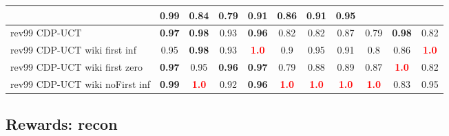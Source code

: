 \documentclass{article}
\begin{document}
\begin{tabular}{|l|r@{$\pm$}rr@{$\pm$}rr@{$\pm$}rr@{$\pm$}rr@{$\pm$}rr@{$\pm$}rr@{$\pm$}rr@{$\pm$}rr@{$\pm$}rr@{$\pm$}r|}
& \multicolumn{2}{c}{0.99}
& \multicolumn{2}{c}{0.84}
& \multicolumn{2}{c}{0.79}
& \multicolumn{2}{c}{0.91}
& \multicolumn{2}{c}{0.86}
& \multicolumn{2}{c}{0.91}
& \multicolumn{2}{c|}{0.95}
\\
\hline
rev99 CDP-UCT
& \multicolumn{2}{c}{\textbf{0.97}}
& \multicolumn{2}{c}{\textbf{0.98}}
& \multicolumn{2}{c}{0.93}
& \multicolumn{2}{c}{\textbf{0.96}}
& \multicolumn{2}{c}{0.82}
& \multicolumn{2}{c}{0.82}
& \multicolumn{2}{c}{0.87}
& \multicolumn{2}{c}{0.79}
& \multicolumn{2}{c}{\textbf{0.98}}
& \multicolumn{2}{c|}{0.82}
\\
rev99 CDP-UCT wiki first inf
& \multicolumn{2}{c}{0.95}
& \multicolumn{2}{c}{\textbf{0.98}}
& \multicolumn{2}{c}{0.93}
& \multicolumn{2}{c}{\textbf{\textcolor{red}{1.0}}}
& \multicolumn{2}{c}{0.9}
& \multicolumn{2}{c}{0.95}
& \multicolumn{2}{c}{0.91}
& \multicolumn{2}{c}{0.8}
& \multicolumn{2}{c}{0.86}
& \multicolumn{2}{c|}{\textbf{\textcolor{red}{1.0}}}
\\
rev99 CDP-UCT wiki first zero
& \multicolumn{2}{c}{\textbf{0.97}}
& \multicolumn{2}{c}{0.95}
& \multicolumn{2}{c}{\textbf{0.96}}
& \multicolumn{2}{c}{\textbf{0.97}}
& \multicolumn{2}{c}{0.79}
& \multicolumn{2}{c}{0.88}
& \multicolumn{2}{c}{0.89}
& \multicolumn{2}{c}{0.87}
& \multicolumn{2}{c}{\textbf{\textcolor{red}{1.0}}}
& \multicolumn{2}{c|}{0.82}
\\
rev99 CDP-UCT wiki noFirst inf
& \multicolumn{2}{c}{\textbf{0.99}}
& \multicolumn{2}{c}{\textbf{\textcolor{red}{1.0}}}
& \multicolumn{2}{c}{0.92}
& \multicolumn{2}{c}{\textbf{0.96}}
& \multicolumn{2}{c}{\textbf{\textcolor{red}{1.0}}}
& \multicolumn{2}{c}{\textbf{\textcolor{red}{1.0}}}
& \multicolumn{2}{c}{\textbf{\textcolor{red}{1.0}}}
& \multicolumn{2}{c}{\textbf{\textcolor{red}{1.0}}}
& \multicolumn{2}{c}{0.83}
& \multicolumn{2}{c|}{0.95}
\\
\hline
\end{tabular}%

\bigskip

\subsection*{Rewards: recon}
\end{document}
